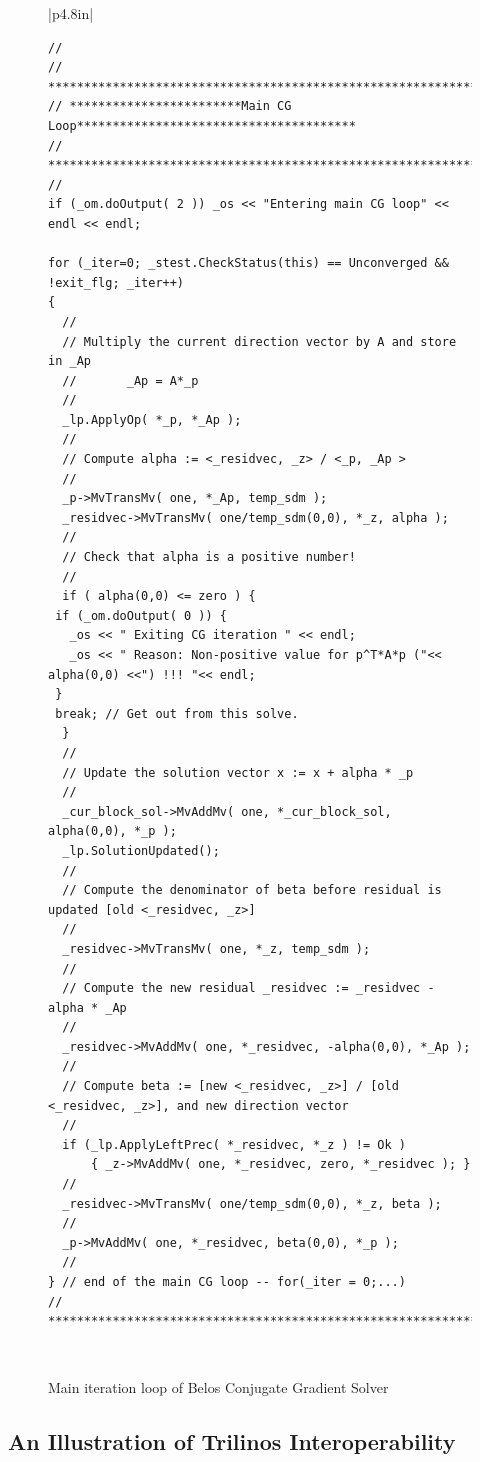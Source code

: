 \documentclass[acmtoms,acmnow]{acmtrans2m}
\begin{document}
\begin{figure}
{\scriptsize
\begin{tabular}{|p{4.8in}|}\hline
\begin{verbatim}
//
// ***************************************************************************
// ************************Main CG Loop***************************************
// ***************************************************************************
//
if (_om.doOutput( 2 )) _os << "Entering main CG loop" << endl << endl;

for (_iter=0; _stest.CheckStatus(this) == Unconverged && !exit_flg; _iter++)
{
  //
  // Multiply the current direction vector by A and store in _Ap
  //       _Ap = A*_p
  //
  _lp.ApplyOp( *_p, *_Ap );
  //
  // Compute alpha := <_residvec, _z> / <_p, _Ap >
  //
  _p->MvTransMv( one, *_Ap, temp_sdm );
  _residvec->MvTransMv( one/temp_sdm(0,0), *_z, alpha );
  //
  // Check that alpha is a positive number!
  //
  if ( alpha(0,0) <= zero ) {
 if (_om.doOutput( 0 )) {
   _os << " Exiting CG iteration " << endl;
   _os << " Reason: Non-positive value for p^T*A*p ("<< alpha(0,0) <<") !!! "<< endl;
 }
 break; // Get out from this solve.
  }
  //
  // Update the solution vector x := x + alpha * _p
  //
  _cur_block_sol->MvAddMv( one, *_cur_block_sol, alpha(0,0), *_p );
  _lp.SolutionUpdated();
  //
  // Compute the denominator of beta before residual is updated [old <_residvec, _z>]
  //
  _residvec->MvTransMv( one, *_z, temp_sdm );
  //
  // Compute the new residual _residvec := _residvec - alpha * _Ap
  //
  _residvec->MvAddMv( one, *_residvec, -alpha(0,0), *_Ap );
  //
  // Compute beta := [new <_residvec, _z>] / [old <_residvec, _z>], and new direction vector
  //
  if (_lp.ApplyLeftPrec( *_residvec, *_z ) != Ok ) 
      { _z->MvAddMv( one, *_residvec, zero, *_residvec ); }
  //
  _residvec->MvTransMv( one/temp_sdm(0,0), *_z, beta );
  //
  _p->MvAddMv( one, *_residvec, beta(0,0), *_p );
  //
} // end of the main CG loop -- for(_iter = 0;...)
// *******************************************************************************
\end{verbatim}
\\\hline
\end{tabular}}
\caption{\label{fig:genericCG} Main iteration loop of Belos Conjugate Gradient Solver}
\end{figure}


\subsection{An Illustration of Trilinos Interoperability}
\label{subsect:meros}
\end{document}
